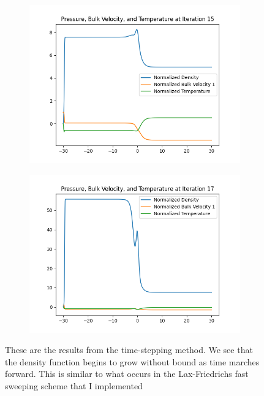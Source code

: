 \documentclass{article}
\begin{document}
\begin{figure}[H]
    \begin{subfigure}[b]{0.45\textwidth}
    \includegraphics[width=\textwidth]{imgs/iter15.png}
        \label{fig:image3}
    \end{subfigure}
    \hfill
    \begin{subfigure}[b]{0.45\textwidth}
    \includegraphics[width=\textwidth]{imgs/iter17.png}
        \label{fig:image4}
    \end{subfigure}
    
    \caption{These are the results from the time-stepping method. We see that the density function begins to grow without bound as time marches forward. This is similar to what occurs in the Lax-Friedrichs fast sweeping scheme that I implemented}
    \label{fig:four_images}
\end{figure}
\end{document}
